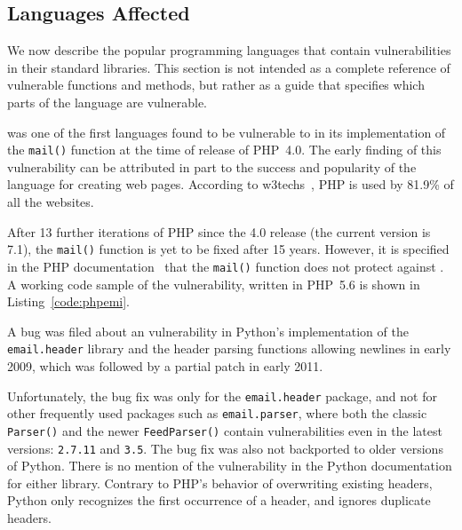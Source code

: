 \subsection{Languages Affected}
\label{languages}
We now describe the popular programming languages that contain \ehi vulnerabilities in their standard \email libraries. This section is not intended as a complete reference of vulnerable functions and methods, but rather as a guide that specifies which parts of the language are vulnerable.

 was one of the first languages found to be vulnerable to \ehi in its implementation of the \texttt{mail()} function at the time of release of PHP~4.0. The early finding of this vulnerability can be attributed in part to the success and popularity of the language for creating web pages. According to w3techs~\cite{W3techs}, PHP is used by 81.9\% of all the websites.

After 13 further iterations of PHP since the 4.0 release (the current version is 7.1), the \texttt{mail()} function is yet to be fixed after 15 years. However, it is specified in the PHP documentation~\cite{PHPDocs} that the \texttt{mail()} function does not protect against \ehi.
A working code sample of the vulnerability, written in PHP~5.6 is shown in  Listing~\ref{code:phpemi}.

\begin{sloppypar}
A bug was filed about an \ehi vulnerability in Python's implementation of the \texttt{email.header} library and the header parsing functions allowing newlines in early 2009, which was followed by a partial patch in early 2011.
\end{sloppypar}

Unfortunately, the bug fix was only for the \texttt{email.header} package, and not for other frequently used packages such as \texttt{email.parser}, where both the classic \texttt{Parser()} and the newer \texttt{FeedParser()} contain \ehi vulnerabilities even in the latest versions: \texttt{2.7.11} and \texttt{3.5}. The bug fix was also not backported to older versions of Python.
There is no mention of the vulnerability in the Python documentation for either library. Contrary to PHP's behavior of overwriting existing headers, Python only recognizes the first occurrence of a header, and ignores duplicate headers.


